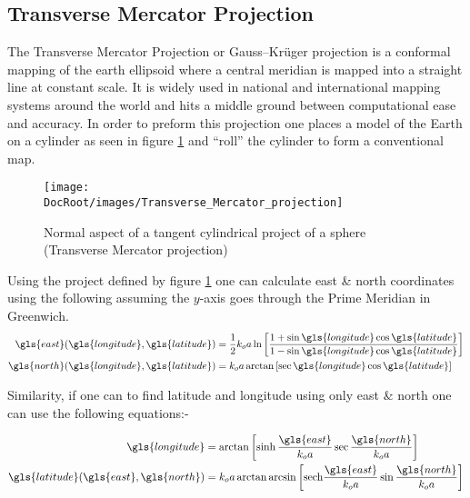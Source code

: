  \tocless\subsection{Transverse Mercator Projection}
 The Transverse Mercator Projection or Gauss–Kr\"{u}ger projection is a conformal mapping of the earth ellipsoid where a central meridian is mapped into a straight line at constant scale. It is widely used in national and international mapping systems around the world and hits a middle ground between computational ease and accuracy. In order to preform this projection one places a model of the Earth on a cylinder as seen in figure \ref{Fig:  Transverse_Mercator_projection} and \enquote{roll} the cylinder to form a conventional map\cite{utm}.
 
 
 \begin{figure}[h]
 	\centering
 	\texttt{[image: \\DocRoot/images/Transverse\_Mercator\_projection]}
 	\caption{Normal aspect of a tangent cylindrical project of a sphere (Transverse Mercator projection)}
 	\label{Fig:  Transverse_Mercator_projection}
 \end{figure}
 
 Using the project defined by figure \ref{Fig:  Transverse_Mercator_projection} one can calculate \gls{east} \& \gls{north} coordinates using the following assuming the $y$-axis goes through the  Prime Meridian in Greenwich. 
 \begin{align}
\begin{split}
 \gls{east}(\gls{longitude},\gls{latitude}) &= \frac{1}{2}k_o a \ln\left[\frac{1 + \sin\gls{longitude}\cos\gls{latitude}}{1 - \sin\gls{longitude}\cos\gls{latitude}}\right]\\
 \gls{north}(\gls{longitude},\gls{latitude}) &= k_o a \arctan\left[\sec\gls{longitude}\cos\gls{latitude}\right]
\end{split}
 \end{align}
 
 Similarity, if one can to find latitude and longitude using  only \gls{east} \& \gls{north} one can use the following equations:-
 
  \begin{align}
  \begin{split}
  \gls{longitude} &= \arctan\left[\sinh\frac{\gls{east}}{k_oa} \sec\frac{\gls{north}}{k_oa}\right]\\
  \gls{latitude}(\gls{east},\gls{north}) &= k_o a \arctan\arcsin\left[\mathrm{sech}\frac{\gls{east}}{k_oa}\sin\frac{\gls{north}}{k_oa}\right]
  \end{split}
  \end{align}
  
